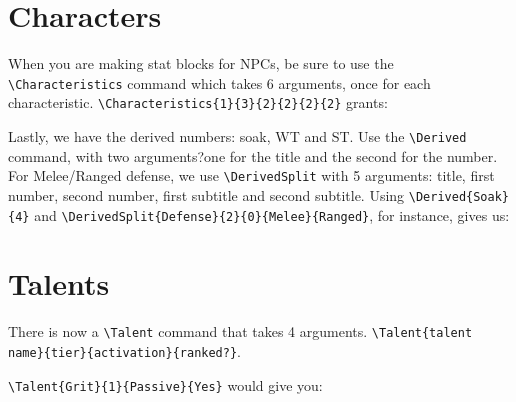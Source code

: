 \documentclass{book}
\begin{document}
\section{Characters}

When you are making stat blocks for NPCs, be sure to use the \verb|\Characteristics| command which takes 6 arguments, once for each characteristic. \verb|\Characteristics{1}{3}{2}{2}{2}{2}| grants:

\vspace{1em}


\vspace{1em}


Lastly, we have the derived numbers: soak, WT and ST. Use the \verb|\Derived| command, with two arguments?one for the title and the second for the number. For Melee/Ranged defense, we use \verb|\DerivedSplit| with 5 arguments: title, first number, second number, first subtitle and second subtitle. Using \verb|\Derived{Soak}{4}| and \verb|\DerivedSplit{Defense}{2}{0}{Melee}{Ranged}|, for instance, gives us:

\vspace{1em}

\hspace*{\fill}\qquad{}\hspace*{\fill}

\section{Talents}

There is now a \verb|\Talent| command that takes 4 arguments. \verb|\Talent{talent name}{tier}{activation}{ranked?}|. 

\verb|\Talent{Grit}{1}{Passive}{Yes}| would give you: 

\end{document}
